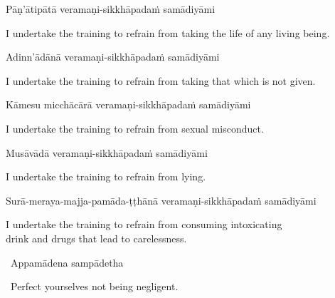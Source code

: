 Pāṇ'ātipātā veramaṇi-sikkhāpadaṁ samādiyāmi

\begin{english-hang}
  I undertake the training\ifdigital\makeatletter\hyperlink{endnote139-appendix}\makeatother \thinspace\fi
  to refrain from taking the life of any living being.
\end{english-hang}

Adinn'ādānā veramaṇi-sikkhāpadaṁ samādiyāmi

\begin{english-hang}
  I undertake the training to refrain from taking that which is not given.
\end{english-hang}

\begin{pali-hang}
Kāmesu micchācārā veramaṇi-sikkhāpadaṁ samādiyāmi
\end{pali-hang}

\begin{english-hang}
  I undertake the training to refrain from sexual misconduct.
\end{english-hang}

Musāvādā veramaṇi-sikkhāpadaṁ samādiyāmi

\begin{english}
  I undertake the training to refrain from lying.
\end{english}

\begin{pali-hang}
  Surā-meraya-majja-pamāda-ṭṭhānā veramaṇi-sikkhāpadaṁ samādiyāmi
\end{pali-hang}

\begin{english-hang}
  I undertake the training to refrain from consuming intoxicating\ifninebythirteen \else \\ \fi
  drink and drugs that lead to carelessness.\ifdigital\makeatletter\hyperlink{endnote140-appendix}\makeatother\fi
\end{english-hang}

\ifninebythirteen\clearpage\fi

\begin{leader}
  \anglebracketleft\ \hspace{-0.5mm}Appamādena sampādetha \hspace{-0.5mm}\anglebracketright\
\end{leader}
\begin{leader-english-below-pali}
  \anglebracketleft\ \hspace{-0.5mm}Perfect yourselves not being negligent. \hspace{-0.5mm}\anglebracketright\
\end{leader-english-below-pali}

